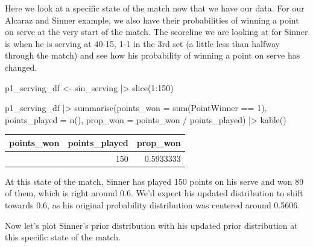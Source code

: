 \documentclass[
  letterpaper,
  DIV=11,
  numbers=noendperiod]{scrartcl}
\newenvironment{Shaded}{\begin{snugshade}}{\end{snugshade}}
\newcommand{\AttributeTok}[1]{\textcolor[rgb]{0.40,0.45,0.13}{#1}}
\newcommand{\DecValTok}[1]{\textcolor[rgb]{0.68,0.00,0.00}{#1}}
\newcommand{\FunctionTok}[1]{\textcolor[rgb]{0.28,0.35,0.67}{#1}}
\newcommand{\NormalTok}[1]{\textcolor[rgb]{0.00,0.23,0.31}{#1}}
\newcommand{\OtherTok}[1]{\textcolor[rgb]{0.00,0.23,0.31}{#1}}
\newcommand{\SpecialCharTok}[1]{\textcolor[rgb]{0.37,0.37,0.37}{#1}}
\begin{document}
\linespread{2}

Here we look at a specific state of the match now that we have our data.
For our Alcaraz and Sinner example, we also have their probabilities of
winning a point on serve at the very start of the match. The scoreline
we are looking at for Sinner is when he is serving at 40-15, 1-1 in the
3rd set (a little less than halfway through the match) and see how his
probability of winning a point on serve has changed.

\linespread{0.9}

\begin{Shaded}
\begin{Highlighting}[]
\NormalTok{p1\_serving\_df }\OtherTok{\textless{}{-}}\NormalTok{ sin\_serving }\SpecialCharTok{|\textgreater{}} \FunctionTok{slice}\NormalTok{(}\DecValTok{1}\SpecialCharTok{:}\DecValTok{150}\NormalTok{)}

\NormalTok{p1\_serving\_df }\SpecialCharTok{|\textgreater{}}
  \FunctionTok{summarise}\NormalTok{(}\AttributeTok{points\_won =} \FunctionTok{sum}\NormalTok{(PointWinner }\SpecialCharTok{==} \DecValTok{1}\NormalTok{),}
            \AttributeTok{points\_played =} \FunctionTok{n}\NormalTok{(),}
            \AttributeTok{prop\_won =}\NormalTok{ points\_won }\SpecialCharTok{/}\NormalTok{ points\_played) }\SpecialCharTok{|\textgreater{}}
  \FunctionTok{kable}\NormalTok{()}
\end{Highlighting}
\end{Shaded}

\begin{longtable}[]{@{}rrr@{}}
\toprule\noalign{}
points\_won & points\_played & prop\_won \\
\midrule\noalign{}
\endhead
\bottomrule\noalign{}
\endlastfoot
89 & 150 & 0.5933333 \\
\end{longtable}

\linespread{2}

At this state of the match, Sinner has played 150 points on his serve
and won 89 of them, which is right around 0.6. We'd expect his updated
distribution to shift towards 0.6, as his original probability
distribution was centered around 0.5606.

Now let's plot Sinner's prior distribution with his updated prior
distribution at this specific state of the match.

\linespread{0.9}
\end{document}
